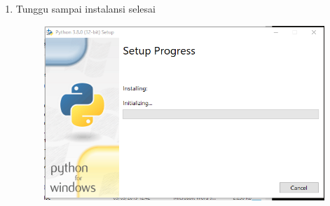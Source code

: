 \begin{enumerate}
    \item Tunggu sampai instalansi selesai
    \begin{figure}[!htbp]
    \centering
    \includegraphics[scale=0.5]{figures/3.png}
    \label{visimisi}
\end{figure}
\end{enumerate}

